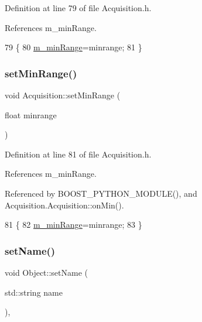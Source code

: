 Definition at line 79 of file Acquisition.\+h.



References m\+\_\+min\+Range.


\begin{DoxyCode}
79                                   \{
80     \hyperlink{classAcquisition_a06b3ea027ebdcb15f64a6517ceb99b76}{m\_minRange}=minrange;
81   \}
\end{DoxyCode}
\mbox{\label{classAcquisition_a8a15ffc6e539a3ae12efe4bea1ca7587}} 
\subsubsection{\texorpdfstring{set\+Min\+Range()}{setMinRange()}\hspace{0.1cm}{\footnotesize\ttfamily [2/2]}}
{\footnotesize\ttfamily void Acquisition\+::set\+Min\+Range (\begin{DoxyParamCaption}\item[{float}]{minrange }\end{DoxyParamCaption})\hspace{0.3cm}{\ttfamily [inline]}}



Definition at line 81 of file Acquisition.\+h.



References m\+\_\+min\+Range.



Referenced by B\+O\+O\+S\+T\+\_\+\+P\+Y\+T\+H\+O\+N\+\_\+\+M\+O\+D\+U\+L\+E(), and Acquisition.\+Acquisition\+::on\+Min().


\begin{DoxyCode}
81                                   \{
82     \hyperlink{classAcquisition_a06b3ea027ebdcb15f64a6517ceb99b76}{m\_minRange}=minrange;
83   \}
\end{DoxyCode}
\mbox{\label{classObject_ae30fea75683c2d149b6b6d17c09ecd0c}} 
\subsubsection{\texorpdfstring{set\+Name()}{setName()}}
{\footnotesize\ttfamily void Object\+::set\+Name (\begin{DoxyParamCaption}\item[{std\+::string}]{name }\end{DoxyParamCaption})\hspace{0.3cm}{\ttfamily [inline]}, {\ttfamily [inherited]}}



